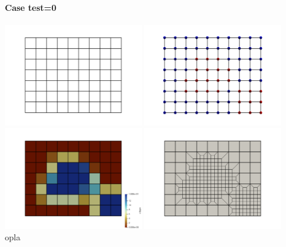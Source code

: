 \paragraph{Case test=0}

\begin{center}
\includegraphics[width=6cm]{python_codes/fieldstone_102/results/test0/mesh1}
\includegraphics[width=6cm]{python_codes/fieldstone_102/results/test0/mesh2}\\
\includegraphics[width=6cm]{python_codes/fieldstone_102/results/test0/mesh3}
\includegraphics[width=6cm]{python_codes/fieldstone_102/results/test0/mesh4}\\
{\captionfont opla}
\end{center}


